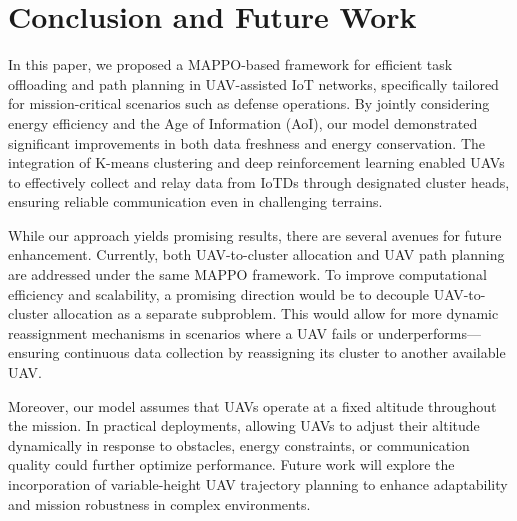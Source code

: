 \documentclass[conference]{IEEEtran}
\begin{document}
\section{Conclusion and Future Work}


In this paper, we proposed a MAPPO-based framework for efficient task offloading and path planning in UAV-assisted IoT networks, specifically tailored for mission-critical scenarios such as defense operations. By jointly considering energy efficiency and the Age of Information (AoI), our model demonstrated significant improvements in both data freshness and energy conservation. The integration of K-means clustering and deep reinforcement learning enabled UAVs to effectively collect and relay data from IoTDs through designated cluster heads, ensuring reliable communication even in challenging terrains.

While our approach yields promising results, there are several avenues for future enhancement. Currently, both UAV-to-cluster allocation and UAV path planning are addressed under the same MAPPO framework. To improve computational efficiency and scalability, a promising direction would be to decouple UAV-to-cluster allocation as a separate subproblem. This would allow for more dynamic reassignment mechanisms in scenarios where a UAV fails or underperforms—ensuring continuous data collection by reassigning its cluster to another available UAV.

Moreover, our model assumes that UAVs operate at a fixed altitude throughout the mission. In practical deployments, allowing UAVs to adjust their altitude dynamically in response to obstacles, energy constraints, or communication quality could further optimize performance. Future work will explore the incorporation of variable-height UAV trajectory planning to enhance adaptability and mission robustness in complex environments.



\end{document}
